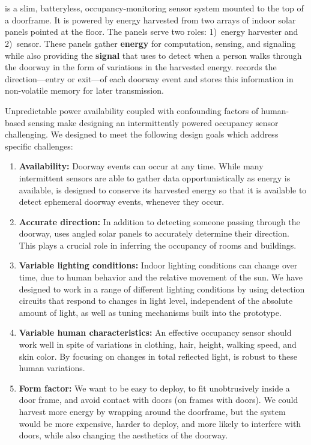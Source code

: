 \section{\sysname}
\label{sec:system}
\sysname is a slim, batteryless, occupancy-monitoring sensor system mounted to the top of a doorframe.
It is powered by energy harvested from two arrays of indoor solar panels pointed at the floor.
The panels serve two roles: 1)~energy harvester and 2)~sensor.
These panels gather \textbf{energy} for computation, sensing, and signaling while also providing the \textbf{signal} that \sysname uses to detect when a person walks through the doorway in the form of variations in the harvested energy.
\sysname records the direction---entry or exit---of each doorway event and stores this information in non-volatile memory for later transmission.


 Unpredictable power availability coupled with confounding factors of human-based sensing make designing an intermittently powered occupancy sensor challenging.
We designed \sysname to meet the following design goals which address specific challenges:
\begin{enumerate}
	\item \textbf{Availability:} Doorway events can occur at any time.
	While many intermittent sensors are able to gather data opportunistically as energy is available, \sysname is designed to conserve its harvested energy so that it is available to detect ephemeral doorway events, whenever they occur.
	\item \textbf{Accurate direction:} In addition to detecting someone passing through the doorway, \sysname uses angled solar panels to accurately determine their direction.
	This plays a crucial role in inferring the occupancy of rooms and buildings.
	\item \textbf{Variable lighting conditions:} Indoor lighting conditions can change over time, due to human behavior and the relative movement of the sun.
	We have designed \sysname to work in a range of different lighting conditions by using detection circuits that respond to changes in light level, independent of the absolute amount of light, as well as tuning mechanisms built into the prototype.
	\item \textbf{Variable human characteristics:} An effective occupancy sensor should work well in spite of variations in clothing, hair, height, walking speed, and skin color. By focusing on changes in total reflected light, \sysname is robust to these human variations.
	\item \textbf{Form factor:} We want \sysname to be easy to deploy, to fit unobtrusively inside a door frame, and avoid contact with doors (on frames with doors).
	We could harvest more energy by wrapping \sysname around the doorframe, but the system would be more expensive, harder to deploy, and more likely to interfere with doors, while also changing the aesthetics of the doorway.
\end{enumerate}


